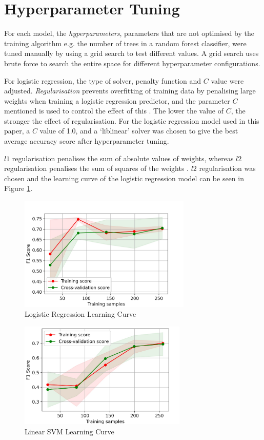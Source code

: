 \section{Hyperparameter Tuning} \label{hpt}
For each model, the \textit{hyperparameters}, parameters that are not optimised by the training algorithm e.g. the number of trees in a random forest classifier, were tuned manually by using a grid search to test different values. A grid search uses brute force to search the entire space for different hyperparameter configurations.

For logistic regression, the type of solver, penalty function and $C$ value were adjusted. \textit{Regularisation} prevents overfitting of training data by penalising large weights when training a logistic regression predictor, and the parameter $C$ mentioned is used to control the effect of this \cite{ahmadian1998regularisation}. The lower the value of $C$, the stronger the effect of regularisation. For the logistic regression model used in this paper, a $C$ value of 1.0, and a `liblinear' solver was chosen to give the best average accuracy score after hyperparameter tuning.

$l1$ regularisation penalises the sum of absolute values of weights, whereas $l2$ regularisation penalises the sum of squares of the weights \cite{ahmadian1998regularisation}. $l2$ regularisation was chosen and the learning curve of the logistic regression model can be seen in Figure \ref{fig2}.

\begin{figure}[ht]
\includegraphics[width=8.2cm]{plots/LR TVT LC F1.pdf}
\caption{Logistic Regression Learning Curve}
\label{fig2}
\centering
\end{figure}

\begin{figure}[ht]
\includegraphics[width=8cm]{plots/SVM TVT LC F1.pdf}
\caption{Linear SVM Learning Curve}
\vspace{-0.5em}
\label{fig3}
\centering
\end{figure}

